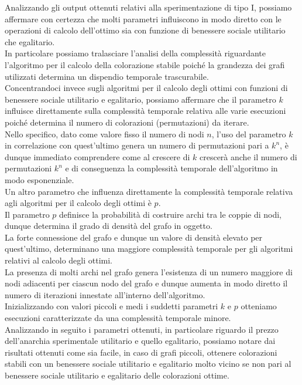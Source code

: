 Analizzando gli output ottenuti relativi alla sperimentazione di tipo I, possiamo affermare con certezza che molti parametri influiscono in modo diretto con le operazioni di calcolo dell'ottimo sia con funzione di benessere sociale utilitario che egalitario.\\
In particolare possiamo tralasciare l'analisi della complessità riguardante l'algoritmo per il calcolo della colorazione stabile poiché la grandezza dei grafi utilizzati determina un dispendio temporale trascurabile.\\

Concentrandoci invece sugli algoritmi per il calcolo degli ottimi con funzioni di benessere sociale utilitario e egalitario, possiamo affermare che il parametro $k$ influisce direttamente sulla complessità temporale relativa alle varie esecuzioni poiché determina il numero di colorazioni (permutazioni) da iterare.\\

Nello specifico, dato come valore fisso il numero di nodi $n$, l'uso del parametro $k$ in correlazione con quest'ultimo genera un numero di permutazioni pari a \(k^n\), è dunque immediato comprendere come al crescere di $k$ crescerà anche il numero di permutazioni \(k^n\) e di conseguenza la complessità temporale dell'algoritmo in modo esponenziale.\\

Un altro parametro che influenza direttamente la complessità temporale relativa agli algoritmi per il calcolo degli ottimi è $p$.\\
Il parametro $p$ definisce la probabilità di costruire archi tra le coppie di nodi, dunque determina il grado di densità del grafo in oggetto.\\
La forte connessione del grafo e dunque un valore di densità elevato per quest'ultimo, determinano una maggiore complessità temporale per gli algoritmi relativi al calcolo degli ottimi.\\
La presenza di molti archi nel grafo genera l'esistenza di un numero maggiore di nodi adiacenti per ciascun nodo del grafo e dunque aumenta in modo diretto il numero di iterazioni innestate all'interno dell'algoritmo.\\

Inizializzando con valori piccoli e medi i suddetti parametri $k$ e $p$ otteniamo esecuzioni caratterizzate da una complessità temporale minore.\\

Analizzando in seguito i parametri ottenuti, in particolare riguardo il prezzo dell'anarchia sperimentale utilitario e quello egalitario, possiamo notare dai risultati ottenuti come sia facile, in caso di grafi piccoli, ottenere colorazioni stabili con un benessere sociale utilitario e egalitario molto vicino se non pari al benessere sociale utilitario e egalitario delle colorazioni ottime.\\

